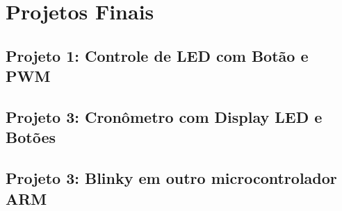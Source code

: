 \section{Projetos Finais}

\subsection{Projeto 1: Controle de LED com Botão e PWM}
\subsection{Projeto 3: Cronômetro com Display LED e Botões}
\subsection{Projeto 3: Blinky em outro microcontrolador ARM}